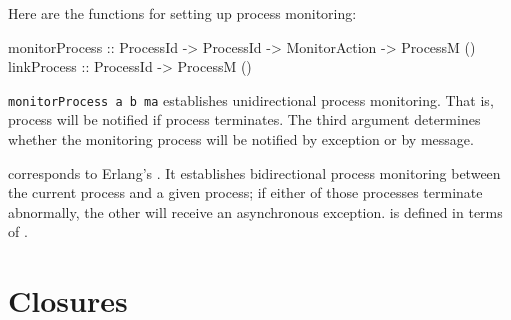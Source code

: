\documentclass[preprint]{sigplanconf}
\begin{document}
Here are the functions for setting up process monitoring:

\begin{code}
monitorProcess :: ProcessId -> ProcessId -> MonitorAction -> ProcessM ()
linkProcess :: ProcessId -> ProcessM ()
\end{code}

\lstinline!monitorProcess a b ma! establishes unidirectional process monitoring. That is, process  will be notified if process  terminates. The third argument determines whether the monitoring process will be notified by exception or by message.

 corresponds to Erlang's . It establishes bidirectional process monitoring between the current process and a given process; if either of those processes terminate abnormally, the other will receive an asynchronous exception.  is defined in terms of . 





\section{Closures}
\label{Closures}

\end{document}
